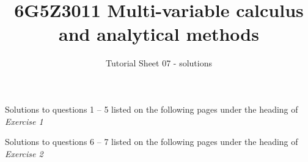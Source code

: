 \documentclass[a4paper]{amsart}
\begin{document}
\title{6G5Z3011 Multi-variable calculus and analytical methods}
\author{Tutorial Sheet 07 - solutions}
\maketitle

Solutions to questions 1 -- 5 listed on the following pages under the heading of \textit{Exercise 1}

Solutions to questions 6 -- 7 listed on the following pages under the heading of \textit{Exercise 2}


\end{document}
